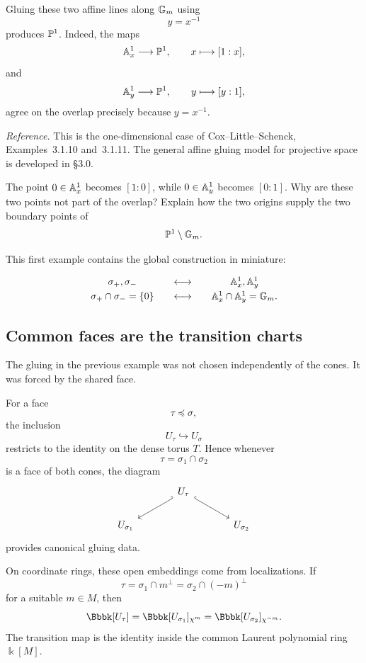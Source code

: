 Gluing these two affine lines along \(\mathbb{G}_{m}\) using
\[
y=x^{-1}
\]
produces \(\mathbb{P}^1\). Indeed, the maps
\[
\mathbb{A}^1_x\longrightarrow\mathbb{P}^1,
\qquad
x\longmapsto[1:x],
\]
and
\[
\mathbb{A}^1_y\longrightarrow\mathbb{P}^1,
\qquad
y\longmapsto[y:1],
\]
agree on the overlap precisely because \(y=x^{-1}\).

\noindent
\textit{Reference.}
This is the one-dimensional case of Cox--Little--Schenck,
Examples~3.1.10 and~3.1.11. The general affine gluing model for
projective space is developed in \S3.0.

\begin{pauseandthink}
The point \(0\in\mathbb{A}^1_x\) becomes \([1:0]\), while
\(0\in\mathbb{A}^1_y\) becomes \([0:1]\). Why are these two points not part
of the overlap? Explain how the two origins supply the two boundary
points of
\[
\mathbb{P}^1\setminus\mathbb{G}_{m}.
\]
\end{pauseandthink}

This first example contains the global construction in miniature:

\[
\begin{array}{c@{\qquad\longleftrightarrow\qquad}c}
\sigma_+,\sigma_-
&
\AAA^1_x,\AAA^1_y
\\[1mm]
\sigma_+\cap\sigma_-=\{0\}
&
\AAA^1_x\cap\AAA^1_y=\Gm.
\end{array}
\]

\subsection{Common faces are the transition charts}

The gluing in the previous example was not chosen independently of
the cones. It was forced by the shared face.

For a face
\[
\tau\preceq\sigma,
\]
the inclusion
\[
U_\tau\hookrightarrow U_\sigma
\]
restricts to the identity on the dense torus \(T\). Hence whenever
\[
\tau=\sigma_1\cap\sigma_2
\]
is a face of both cones, the diagram
\[
\begin{tikzcd}[column sep=large]
&
U_\tau
\arrow[dl,hook']
\arrow[dr,hook]
&
\\
U_{\sigma_1}
&&
U_{\sigma_2}
\end{tikzcd}
\]
provides canonical gluing data.

On coordinate rings, these open embeddings come from localizations.
If
\[
\tau
=
\sigma_1\cap m^\perp
=
\sigma_2\cap(-m)^\perp
\]
for a suitable \(m\in M\), then
\[
\Bbbk[U_\tau]
=
\Bbbk[U_{\sigma_1}]_{\character{m}}
=
\Bbbk[U_{\sigma_2}]_{\character{-m}}.
\]
The transition map is the identity inside the common Laurent
polynomial ring \(\Bbbk[M]\).

